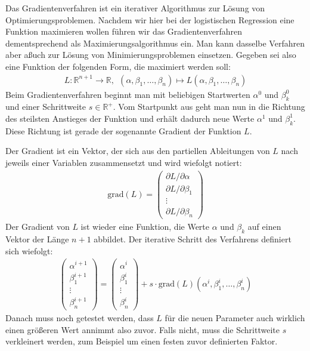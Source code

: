 Das Gradientenverfahren ist ein iterativer Algorithmus zur Lösung von Optimierungsproblemen. Nachdem wir hier bei der logistischen Regression eine Funktion maximieren wollen führen wir das Gradientenverfahren dementsprechend als Maximierungsalgorithmus ein. Man kann dasselbe Verfahren aber aßuch zur Lösung von Minimierungsproblemen einsetzen. Gegeben sei also eine Funktion der folgenden Form, die maximiert werden soll:
\begin{align*}
    L: \mathbb{R}^{n+1} \rightarrow \mathbb{R},~~ (\alpha, \beta_1, \dots, \beta_n) \mapsto L(\alpha, \beta_1, \dots, \beta_n)
\end{align*}
Beim Gradientenverfahren beginnt man mit beliebigen Startwerten $\alpha^0$ und $\beta_k^0$ und einer Schrittweite $s \in \mathbb{R}^+$. Vom Startpunkt aus geht man nun in die Richtung des steilsten Anstieges der Funktion und erhält dadurch neue Werte $\alpha^1$ und $\beta_k^1$. Diese Richtung ist gerade der sogenannte Gradient der Funktion $L$.

Der Gradient ist ein Vektor, der sich aus den partiellen Ableitungen von $L$ nach jeweils einer Variablen zusammensetzt und wird wiefolgt notiert:
\begin{align*}
    \text{grad}(L) = \begin{pmatrix}
        \partial L / \partial \alpha \\
        \partial L / \partial \beta_1 \\
        \vdots \\
        \partial L / \partial \beta_n
    \end{pmatrix}
\end{align*}
Der Gradient von $L$ ist wieder eine Funktion, die Werte $\alpha$ und $\beta_k$ auf einen Vektor der Länge $n+1$ abbildet. Der iterative Schritt des Verfahrens definiert sich wiefolgt:
\begin{align*}
    \begin{pmatrix}
        \alpha^{i + 1} \\
        \beta_1^{i + 1} \\
        \vdots \\
        \beta_n^{i + 1}
    \end{pmatrix} = \begin{pmatrix}
        \alpha^i \\
        \beta_1^i \\
        \vdots \\
        \beta_n^i
    \end{pmatrix} + s \cdot \text{grad}(L) (\alpha^i, \beta_1^i, \dots, \beta_n^i)
\end{align*}
Danach muss noch getestet werden, dass $L$ für die neuen Parameter auch wirklich einen größeren Wert annimmt also zuvor. Falls nicht, muss die Schrittweite $s$ verkleinert werden, zum Beispiel um einen festen zuvor definierten Faktor.

